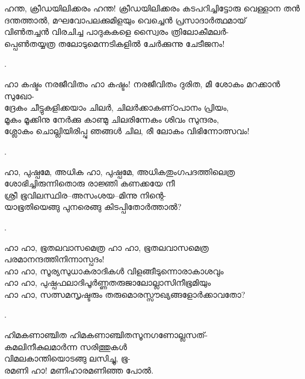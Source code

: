 \begin{enumerate}

\begin{slokam}{\VSv}{\VNM}{ഹന്ത, ക്രീഡയിലിക്കരം}
 ഹന്ത! ക്രീഡയിലിക്കരം കടപറിച്ചിട്ടോരു വെള്ളാന തൻ\\
ദന്തത്താൽ, മഘവോപലക്കുമിളയും വെച്ചെൻ പ്രസാദാർത്ഥമായ്‌\\
വിൺതച്ചൻ വിരചിച്ച പാദുകകളെ സ്വൈരം ത്രിലോകീമലർ-\\
പ്പെൺതയ്യത്ര തലോടുമെന്നടികളിൽ ചേർക്കുന്നു ചേടീജനം!
\end{slokam}


.

\begin{slokam}{\VSv}{\Vyl}{ഹാ കഷ്ടം നരജീവിതം}
ഹാ കഷ്ടം! നരജീവിതം ദുരിത, മീ ശോകം മറക്കാൻ സുഖോ-\\
ദ്രേകം ചീട്ടുകളിക്കയാം ചിലർ, ചിലർക്കാകണ്‌ഠപാനം പ്രിയം,\\
മൂകം മൂക്കിനു നേർക്കു കാണ്മു ചിലരിന്നേകം ശിവം സുന്ദരം,\\
ശ്ലോകം ചൊല്ലിയിരിപ്പു ഞങ്ങള്‍ ചില, രീ ലോകം വിഭിന്നോത്സവം!
\end{slokam}


.

\begin{slokam}{\VVt}{\KA}{ഹാ, പുഷ്പമേ, അധിക}
ഹാ, പുഷ്പമേ, അധികതുംഗപദത്തിലെത്ര\\
ശോഭിച്ചിരുന്നിതൊരു രാജ്ഞി കണക്കയേ നീ\\
ശ്രീ ഭൂവിലസ്ഥിര--അസംശയ--മിന്നു നിന്റെ-\\
യാഭൂതിയെങ്ങു പുനരെങ്ങു കിടപ്പിതോർത്താൽ?
\end{slokam}


.

\begin{slokam}{\VSv}{\KCKP}{ഹാ ഹാ, ഭൂതലവാസമെത്ര}
ഹാ ഹാ, ഭൂതലവാസമെത്ര പരമാനന്ദത്തിനിന്നാസ്പദം! \\
ഹാ ഹാ, സൂര്യസുധാകരാദികൾ വിളങ്ങീടുന്നൊരാകാശവും\\
ഹാ ഹാ, പുഷ്പഫലാദിപൂർണ്ണതരുജാലോല്ലാസിനീഭൂമിയും\\
ഹാ ഹാ, സത്സമസൃഷ്ടരും തരുമൊരസ്സൗഖ്യങ്ങളോർക്കാവതോ?
\end{slokam}



.

\begin{slokam}{\VDv}{\Unk}{ഹിമകണാഞ്ചിത}
ഹിമകണാഞ്ചിതസൂനഗണോല്ലസത്-\\
കമലിനീകുലമാർന്ന സരിത്തുകൾ\\
വിമലകാന്തിയൊടങ്ങു ലസിച്ചു, ഭൂ-\\
രമണി ഹാ! മണിഹാരമണിഞ്ഞ പോൽ. 
\end{slokam}


\end{enumerate}
